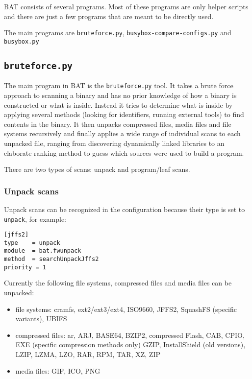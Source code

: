 \documentclass[10pt]{article}
\begin{document}
BAT consists of several programs. Most of these programs are only helper scripts
and there are just a few programs that are meant to be directly used.

The main programs are \texttt{bruteforce.py},
\texttt{busybox-compare-configs.py} and \texttt{busybox.py}

\subsection{\texttt{bruteforce.py}}

The main program in BAT is the \texttt{bruteforce.py} tool. It takes a brute
force approach to scanning a binary and has no prior knowledge of how a binary
is constructed or what is inside. Instead it tries to determine what is inside
by applying several methods (looking for identifiers, running external tools)
to find contents in the binary. It then unpacks compressed files, media files
and file systems recursively and finally applies a wide range of individual
scans to each unpacked file, ranging from discovering dynamically linked
libraries to an elaborate ranking method to guess which sources were used to
build a program.

There are two types of scans: unpack and program/leaf scans.

\subsubsection{Unpack scans}

Unpack scans can be recognized in the configuration because their type is set
to \texttt{unpack}, for example:

\begin{verbatim}
[jffs2]
type    = unpack
module  = bat.fwunpack
method  = searchUnpackJffs2
priority = 1
\end{verbatim}

Currently the following file systems, compressed files and media files can be
unpacked:

\begin{itemize}
\item file systems: cramfs, ext2/ext3/ext4, ISO9660, JFFS2, SquashFS (specific
variants), UBIFS
\item compressed files: ar, ARJ, BASE64, BZIP2, compressed Flash, CAB, CPIO,
EXE (specific compression methods only) GZIP, InstallShield (old versions),
LZIP, LZMA, LZO, RAR, RPM, TAR, XZ, ZIP
\item media files: GIF, ICO, PNG
\end{itemize}
\end{document}
